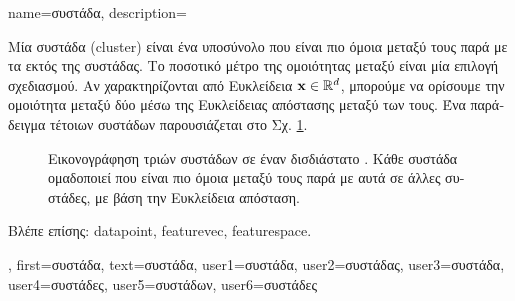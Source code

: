 {name={\foreignlanguage{greek}{συστάδα}}, 
	description={\foreignlanguage{greek}{Μία συστάδα} (cluster) \foreignlanguage{greek}{είναι ένα υποσύνολο}
		 \foreignlanguage{greek}{που είναι πιο όμοια μεταξύ τους παρά με τα}  
		\foreignlanguage{greek}{εκτός της συστάδας. Το ποσοτικό μέτρο της ομοιότητας μεταξύ} 
		 \foreignlanguage{greek}{είναι μία επιλογή σχεδιασμού. Αν}  
		\foreignlanguage{greek}{χαρακτηρίζονται από Ευκλείδεια}  ${\bf x} \in \mathbb{R}^{d}$, 
		\foreignlanguage{greek}{μπορούμε να ορίσουμε την ομοιότητα μεταξύ δύο}  \foreignlanguage{greek}{μέσω της 
		Ευκλείδειας απόστασης μεταξύ των}  \foreignlanguage{greek}{τους. Ένα παράδειγμα τέτοιων συστάδων 
		παρουσιάζεται στο Σχ.} \ref{fig:clusters_dict}.\\
		\begin{figure}[H]
		\centering
		{
		\caption{\foreignlanguage{greek}{Εικονογράφηση τριών συστάδων σε έναν δισδιάστατο} . \foreignlanguage{greek}{Κάθε 
		συστάδα ομαδοποιεί}  \foreignlanguage{greek}{που είναι πιο όμοια μεταξύ τους παρά με αυτά σε άλλες συστάδες, με βάση την 
		Ευκλείδεια απόσταση.} }
		\label{fig:clusters_dict} }
		\end{figure}
		\foreignlanguage{greek}{Βλέπε επίσης:} \gls{datapoint}, \gls{featurevec}, \gls{featurespace}.},
	first={\foreignlanguage{greek}{συστάδα}},
	text={\foreignlanguage{greek}{συστάδα}},
	user1={\foreignlanguage{greek}{συστάδα}}, %
	user2={\foreignlanguage{greek}{συστάδας}}, %
	user3={\foreignlanguage{greek}{συστάδα}}, %
	user4={\foreignlanguage{greek}{συστάδες}}, %
	user5={\foreignlanguage{greek}{συστάδων}}, %
	user6={\foreignlanguage{greek}{συστάδες}} %
}

